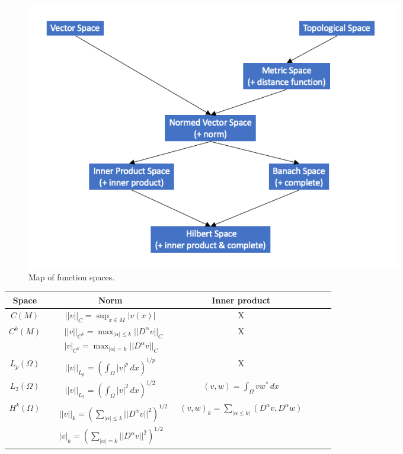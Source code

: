 \documentclass[oneside,a4paper,11pt]{report}
\begin{document}
\begin{figure}[ht]
   \centering
   \includegraphics[width=0.8\textwidth]{../../images/function_spaces.png}
   \caption{Map of function spaces.}
   \label{fig:function_spaces}
\end{figure}

\begin{center}
\begin{tabular}{Sc|Sc|Sc}
    Space & Norm & Inner product \\
    \hline
    $C(M)$ & $ \displaystyle ||v||_C = \sup_{x \in M} |v(x)| $ & X \\
    \hline
    $C^k(M)$ & $\begin{aligned} &||v||_{C^k} = \max_{|\alpha| \le k} ||D^\alpha v||_C \\ &|v|_{C^k}=\max_{|\alpha| = k} ||D^\alpha v||_C \end{aligned}$ & X \\
    \hline
    $L_p(\Omega)$ & $ \displaystyle ||v||_{L_p} = \left ( \int_\Omega |v|^p \, dx \right)^{1/p} $ & X \\
    \hline
    $L_2(\Omega)$ & $ \displaystyle ||v||_{L_2} = \left ( \int_\Omega |v|^2 \, dx \right)^{1/2} $ & $ \displaystyle (v,w) = \int_\Omega vw^* \, dx $ \\
    \hline
    $H^k(\Omega)$ & $ \begin{aligned} &||v||_k = \left ( \sum_{|\alpha| \le k} ||D^\alpha v||^2 \right )^{1/2} \\ &|v|_k = \left ( \sum_{|\alpha| = k} ||D^\alpha v||^2 \right )^{1/2} \end{aligned}$ & $ \displaystyle (v,w)_k = \sum_{|\alpha \le k|} (D^\alpha v, D^\alpha w) $
\end{tabular}
\end{center}
\end{document}
